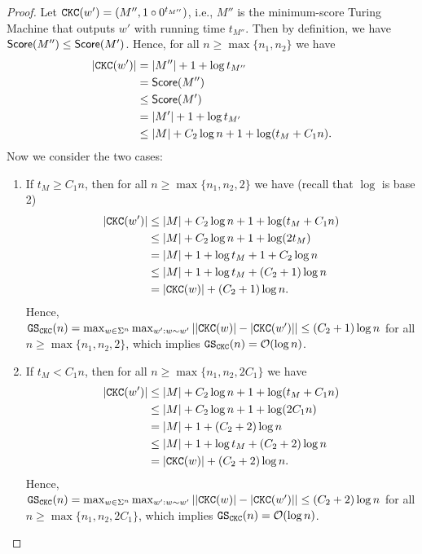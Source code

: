 \begin{proof}
    Let $\mathtt{CKC}(w')=(M'',1\circ0^{t_{M''}})$, i.e., $M''$ is the minimum-score Turing Machine that outputs $w'$ with running time $t_{M''}$. Then by definition, we have $\mathsf{Score}(M'')\leq\mathsf{Score}(M')$. Hence, for all $n\geq \max\{n_1,n_2\}$ we have
    \begin{align*}
        |\mathtt{CKC}(w')| &= |M''|+1+\log t_{M''}\\
        &=\mathsf{Score}(M'')\\
        &\leq \mathsf{Score}(M')\\
        &= |M'|+1+\log t_{M'}\\
        &\leq |M|+C_2\log n + 1 + \log(t_M+C_1 n).
    \end{align*}
    Now we consider the two cases:
    \begin{enumerate}
        \item If $t_M\geq C_1n$, then for all $n\geq\max\{n_1,n_2,2\}$ we have (recall that $\log$ is base 2)
        \begin{align*}
            |\mathtt{CKC}(w')| &\leq |M|+C_2\log n + 1 + \log(t_M+C_1 n)\\
            &\leq |M|+C_2\log n + 1 + \log(2t_M)\\
            &= |M|+1+\log t_M + 1 + C_2\log n\\
            &\leq |M|+1+\log t_M + (C_2+1)\log n\\
            &=|\mathtt{CKC}(w)|+(C_2+1)\log n.
        \end{align*}
        Hence, $\mathtt{GS}_{\mathtt{CKC}}(n)=\max_{w\in\Sigma^n}\max_{w':w\sim w'}||\mathtt{CKC}(w)|-|\mathtt{CKC}(w')||\leq (C_2+1)\log n$ for all $n\geq\max\{n_1,n_2,2\}$, which implies $\GS_\ckc(n)=\O{\log n}$.
        \item If $t_M<C_1n$, then for all $n\geq\max\{n_1,n_2,2C_1\}$ we have
        \begin{align*}
            |\mathtt{CKC}(w')| &\leq |M|+C_2\log n + 1 + \log(t_M+C_1 n)\\
            &\leq |M|+C_2\log n + 1 + \log(2C_1n)\\
            &=|M|+1+(C_2+2)\log n\\
            &\leq |M|+1+\log t_M+(C_2+2)\log n\\
            &=|\mathtt{CKC}(w)|+(C_2+2)\log n.
        \end{align*}
        Hence, $\mathtt{GS}_{\mathtt{CKC}}(n)=\max_{w\in\Sigma^n}\max_{w':w\sim w'}||\mathtt{CKC}(w)|-|\mathtt{CKC}(w')||\leq (C_2+2)\log n$ for all $n\geq\max\{n_1,n_2,2C_1\}$, which implies $\GS_\ckc(n)=\O{\log n}$.\qedhere
    \end{enumerate}
\end{proof}

